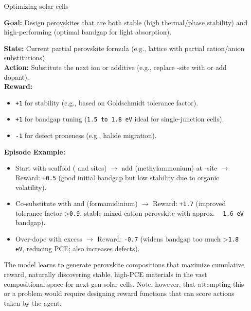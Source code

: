 \begin{examplebox}[label={example:rl}]{Optimizing solar cells}

\textbf{Goal:} Design perovskites that are both stable (high thermal/phase stability) and high-performing (optimal bandgap for light absorption).

\textbf{State:} Current partial perovskite formula (e.g.,  lattice with partial cation/anion substitutions). \\

\textbf{Action:} Substitute the next ion or additive (e.g., replace -site with  or add  dopant). \\

\textbf{Reward:}
\begin{itemize}
    \item \texttt{+1} for stability (e.g., based on Goldschmidt tolerance factor).
    \item \texttt{+1} for bandgap tuning (\texttt{1.5 to 1.8 eV} ideal for single-junction cells).
    \item \texttt{-1} for defect proneness (e.g., halide migration).
\end{itemize}

\textbf{Episode Example:}

\begin{itemize}
    \item Start with  scaffold ( and  sites) $\rightarrow$ add  (methylammonium) at -site $\rightarrow$ Reward: \texttt{+0.5} (good initial bandgap but low stability due to organic volatility).
    \item Co-substitute with  and  (formamidinium) $\rightarrow$ Reward: \texttt{+1.7} (improved tolerance factor \textgreater{}\texttt{0.9}, stable mixed-cation perovskite with approx. ~ \texttt{1.6 eV} bandgap).
    \item Over-dope with excess  $\rightarrow$ Reward: \texttt{-0.7} (widens bandgap too much \textgreater{}\texttt{1.8 eV}, reducing PCE; also increases defects).
\end{itemize}


The model learns to generate perovskite compositions that maximize cumulative reward, naturally discovering stable, high-PCE materials in the vast compositional space for next-gen solar cells. Note, however, that attempting this or a problem would require designing reward functions that can score actions taken by the agent.

\end{examplebox}

